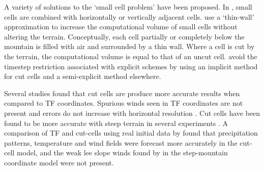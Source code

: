 A variety of solutions to the `small cell problem' have been proposed.  In \textcite{yamazaki-satomura2010}, small cells are combined with horizontally or vertically adjacent cells.     \textcite{steppeler2002} use a `thin-wall' approximation to increase the computational volume of small cells without altering the terrain.  Conceptually, each cell partially or completely below the mountain is filled with air and surrounded by a thin wall.  Where a cell is cut by the terrain, the computational volume is equal to that of an uncut cell.  \textcite{jebens2011} avoid the timestep restriction associated with explicit schemes by using an implicit method for cut cells and a semi-explicit method elsewhere.

Several studies found that cut cells are produce more accurate results when compared to TF coordinates.  Spurious winds seen in TF coordinates are not present and errors do not increase with horizontal resolution \autocite{good2013}.  Cut cells have been found to be more accurate with steep terrain in several experiments \parencites{good2013}{yamazaki-satomura2010}.  A comparison of TF and cut-cells using real initial data by \textcite{steppeler2006} found that precipitation patterns, temperature and wind fields were forecast more accurately in the cut-cell model, and the weak lee slope winds found by \textcite{gallus-klemp2000} in the step-mountain coordinate model were not present.  



